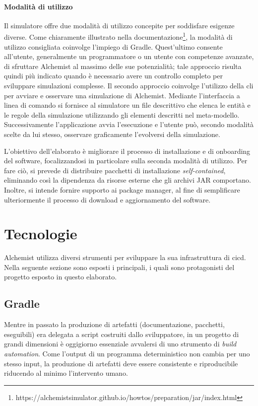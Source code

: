 \paragraph{Modalità di utilizzo} Il simulatore offre due modalità di utilizzo concepite per soddisfare esigenze diverse. 
Come chiaramente illustrato nella documentazione\footnote{https://alchemistsimulator.github.io/howtos/preparation/jar/index.html}, la modalità di utilizzo consigliata coinvolge l'impiego di Gradle. Quest'ultimo consente all'utente, generalmente un programmatore o un utente con competenze avanzate, di sfruttare Alchemist al massimo delle sue potenzialità; tale approccio risulta quindi più indicato quando è necessario avere un controllo completo per sviluppare simulazioni complesse. Il secondo approccio coinvolge l'utilizzo della \ac{cli} per avviare e osservare una simulazione di Alchemist. Mediante l'interfaccia a linea di comando si fornisce al simulatore un file descrittivo che elenca le entità e le regole della simulazione utilizzando gli elementi descritti nel meta-modello. Successivamente l'applicazione avvia l'esecuzione e l'utente può, secondo modalità scelte da lui stesso, osservare graficamente l'evolversi della simulazione.

L'obiettivo dell'elaborato è migliorare il processo di installazione e di onboarding del software, focalizzandosi in particolare sulla seconda modalità di utilizzo. Per fare ciò, si prevede di distribuire pacchetti di installazione \textit{self-contained}, eliminando così la dipendenza da risorse esterne che gli archivi JAR comportano. Inoltre, si intende fornire supporto ai package manager, al fine di semplificare ulteriormente il processo di download e aggiornamento del software.

\section{Tecnologie}\label{sec:technologies}

Alchemist utilizza diversi strumenti per sviluppare la sua infrastruttura di \ac{cicd}. Nella seguente sezione sono esposti i principali, i quali sono protagonisti del progetto esposto in questo elaborato.

\subsection{Gradle}

Mentre in passato la produzione di artefatti (documentazione, pacchetti, eseguibili) era delegata a script costruiti dallo sviluppatore, in un progetto di grandi dimensioni è oggigiorno essenziale avvalersi di uno strumento di \textit{build automation}. Come l'output di un programma deterministico non cambia per uno stesso input, la produzione di artefatti deve essere consistente e riproducibile riducendo al minimo l'intervento umano. 

